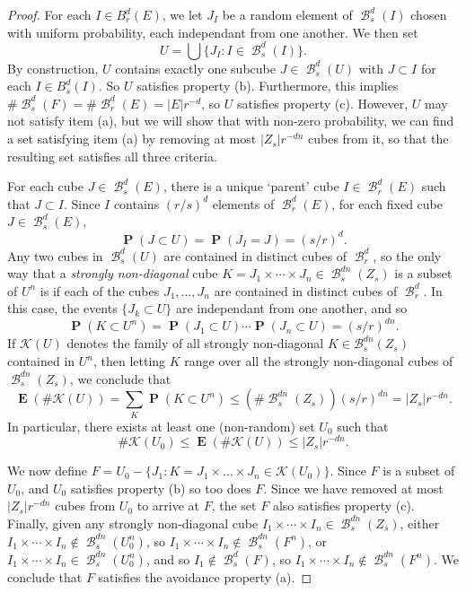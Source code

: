 \documentclass[dvipsnames,letterpaper,12pt]{article}
\theoremstyle{plain}
\DeclareMathOperator{\Prob}{\mathbf{P}}
\DeclareMathOperator{\Expect}{\mathbf{E}}
\DeclareMathOperator{\B}{\mathcal{B}}
\begin{document}
\begin{proof}
	For each $I \in B_r^d(E)$, we let $J_I$ be a random element of $\B^d_s(I)$ chosen with uniform probability, each independant from one another. We then set
	\[ U = \bigcup \{ J_I : I \in \B^d_s(I) \}. \]
	By construction, $U$ contains exactly one subcube $J \in \B_s^d(U)$ with $J \subset I$ for each $I \in B^d_s(I)$. So $U$ satisfies property (b). Furthermore, this implies $\# \B_s^d(F) = \# \B_r^d(E) = |E| r^{-d}$, so $U$ satisfies property (c). However, $U$ may not satisfy item (a), but we will show that with non-zero probability, we can find a set satisfying item (a) by removing at most $|Z_s| r^{-dn}$ cubes from it, so that the resulting set satisfies all three criteria.

	For each cube $J \in \B_s^d(E)$, there is a unique `parent' cube $I \in \B_r^d(E)$ such that $J \subset I$. Since $I$ contains $(r/s)^d$ elements of $\B_r^d(E)$, for each fixed cube $J \in \B_s^d(E)$,
	\[ \Prob(J \subset U) = \Prob(J_I = J) = (s/r)^d. \]
	Any two cubes in $\B_s^d(U)$ are contained in distinct cubes of $\B_r^d$, so the only way that a {\it strongly non-diagonal} cube $K = J_1 \times \cdots \times J_n \in \B_s^{dn}(Z_s)$ is a subset of $U^n$ is if each of the cubes $J_1, \dots, J_n$ are contained in distinct cubes of $\B_r^d$. In this case, the events $\{ J_k \subset U \}$ are independant from one another, and so
	\[ \Prob(K \subset U^n) = \Prob(J_1 \subset U) \cdots \Prob(J_n \subset U) = (s/r)^{dn}. \]
	If $\mathcal{K}(U)$ denotes the family of all strongly non-diagonal $K \in \mathcal{B}_s^{dn}(Z_s)$ contained in $U^n$, then letting $K$ range over all the strongly non-diagonal cubes of $\B_s^{dn}(Z_s)$, we conclude that
	\[ \Expect(\# \mathcal{K}(U)) = \sum_K \Prob(K \subset U^n) \leq (\# \B_s^{dn}(Z_s)) (s/r)^{dn} = |Z_s| r^{-dn}. \]
	In particular, there exists at least one (non-random) set $U_0$ such that
	\[ \# \mathcal{K}(U_0) \leq \Expect(\# \mathcal{K}(U)) \leq |Z_s| r^{-dn}. \]

	We now define $F = U_0 - \{ J_1: K = J_1 \times \dots \times J_n \in \mathcal{K}(U_0) \}$. Since $F$ is a subset of $U_0$, and $U_0$ satisfies property (b) so too does $F$. Since we have removed at most $|Z_s| r^{-dn}$ cubes from $U_0$ to arrive at $F$, the set $F$ also satisfies property (c). Finally, given any strongly non-diagonal cube $I_1 \times \cdots \times I_n \in \B_s^{dn}(Z_s)$, either $I_1 \times \cdots \times I_n \not \in \B_s^{dn}(U_0^n)$, so $I_1 \times \cdots \times I_n \not \in \B_s^{dn}(F^n)$, or $I_1 \times \cdots \times I_n \in \B_s^{dn}(U_0^n)$, and so $I_1 \not \in \B_s^d(F)$, so $I_1 \times \cdots \times I_n \not \in \B_s^{dn}(F^n)$. We conclude that $F$ satisfies the avoidance property (a).
\end{proof}
\end{document}
